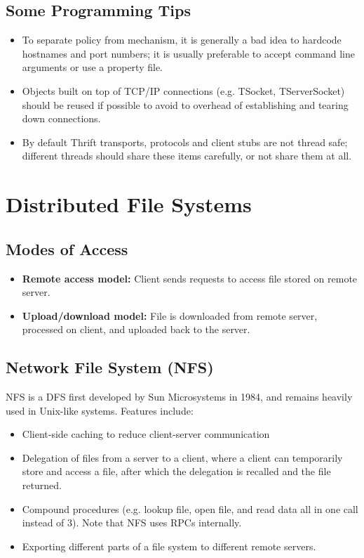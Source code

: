 \documentclass[12pt,titlepage]{article}
\begin{document}
    \subsection{Some Programming Tips}
      \begin{itemize}
        \item To separate policy from mechanism, it is generally a bad idea to hardcode hostnames and port numbers; it is usually preferable to accept command line
        arguments or use a property file.
        \item Objects built on top of TCP/IP connections (e.g. TSocket, TServerSocket) should be reused if possible to avoid to overhead of establishing and tearing
        down connections.
        \item By default Thrift transports, protocols and client stubs are not thread safe; different threads should share these items carefully, or not share them
        at all.
      \end{itemize}

  \newpage

  \section{Distributed File Systems}

    \subsection{Modes of Access}
      \begin{itemize}
        \item \textbf{Remote access model:} Client sends requests to access file stored on remote server.
        \item \textbf{Upload/download model:} File is downloaded from remote server, processed on client, and uploaded back to the server.
      \end{itemize}

    \subsection{Network File System (NFS)}
      NFS is a DFS first developed by Sun Microsystems in 1984, and remains heavily used in Unix-like systems. Features include:
      \begin{itemize}
        \item Client-side caching to reduce client-server communication
        \item Delegation of files from a server to a client, where a client can temporarily store and access a file, after which the delegation is recalled and
        the file returned.
        \item Compound procedures (e.g. lookup file, open file, and read data all in one call instead of 3). Note that NFS uses RPCs internally.
        \item Exporting different parts of a file system to different remote servers.
      \end{itemize}
\end{document}
